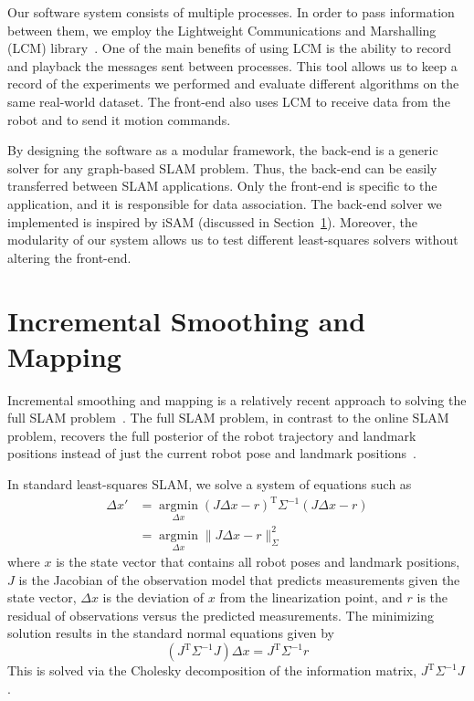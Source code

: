 \documentclass[conference]{IEEEtran}
\begin{document}
Our software system consists of multiple processes. In order to pass information between
them, we employ the Lightweight Communications and Marshalling (LCM)
library~\cite{huang2010}. One of the main benefits of using LCM is the ability to record
and playback the messages sent between processes. This tool allows us to keep a record of
the experiments we performed and evaluate different algorithms on the same
real-world dataset. The front-end also uses LCM to receive data from the robot and to send
it motion commands.

By designing the software as a modular framework, the back-end is a generic solver for any
graph-based \ac{SLAM} problem. Thus, the back-end can be easily transferred between
\ac{SLAM} applications. Only the front-end is specific to the application, and it is
responsible for data association. The back-end solver we implemented is inspired by iSAM
(discussed in Section~\ref{sec:incrementalsmoothingandmapping}). Moreover, the modularity
of our system allows us to test different least-squares solvers without altering the
front-end.

\section{Incremental Smoothing and Mapping}
\label{sec:incrementalsmoothingandmapping}


Incremental smoothing and mapping is a relatively recent approach to solving the
full \ac{SLAM} problem~\cite{Kaess08tro}.  The full \ac{SLAM} problem, in contrast to the
online \ac{SLAM} problem, recovers the full posterior of the robot trajectory and landmark
positions instead of just the current robot pose and landmark
positions~\cite{thrun2005probabilistic}.

In standard least-squares \ac{SLAM}, we solve a system of equations such as
\begin{align*}
  \Delta x' &= \underset{\Delta x}{\operatorname{argmin}} (J\Delta x - r)^{\text{T}}
\Sigma^{-1} (J\Delta x - r) \\
  &= \underset{\Delta x}{\operatorname{argmin}} \| J\Delta x - r \|^2_{\Sigma}
\end{align*}
where $x$ is the state vector that contains all robot poses and
landmark positions, $J$ is the Jacobian of the observation model that
predicts measurements given the state vector, $\Delta x$ is the
deviation of $x$ from the linearization point, and $r$ is the residual
of observations versus the predicted measurements. The minimizing
solution results in the standard normal equations given by
\[
(J^{\text{T}} \Sigma^{-1} J) \Delta x = J^{\text{T}} \Sigma^{-1}r
\]
This is solved via the Cholesky decomposition of the information matrix,
$J^{\text{T}}\Sigma^{-1}J$.
\end{document}
